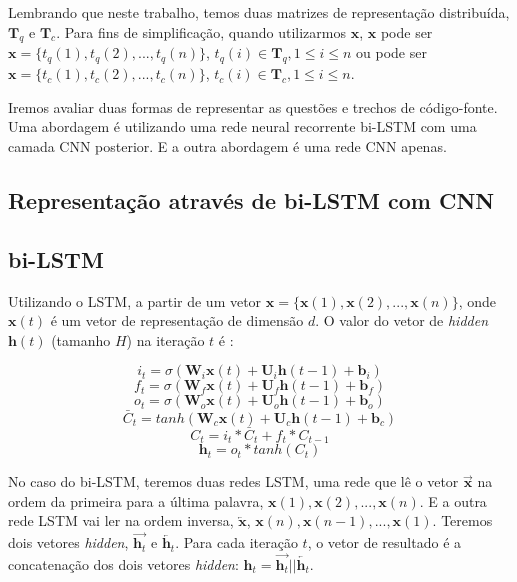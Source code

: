 Lembrando que neste trabalho, temos duas matrizes de representação distribuída, $\bm{T}_{q}$ e $\bm{T}_{c}$. Para fins de simplificação, quando utilizarmos $\bm{x}$, $\bm{x}$ pode ser $\bm{x} = \{ t_{q}(1), t_{q}(2), . . ., t_{q}(n)\}$, $t_{q}(i) \in \bm{T}_{q}, 1 \leq i \leq n$ ou pode ser $\bm{x} = \{ t_{c}(1), t_{c}(2), . . ., t_{c}(n)\}$, $t_{c}(i) \in \bm{T}_{c}, 1 \leq i \leq n$.


Iremos avaliar duas formas de representar as questões e trechos de código-fonte. Uma abordagem é utilizando uma rede neural recorrente bi-LSTM com uma camada CNN posterior. E a outra abordagem é uma rede CNN apenas.

\subsection{Representação através de bi-LSTM com CNN}
\label{sec:representation-bi-lstm-cnn}
\subsection{bi-LSTM}
\label{sec:representation-bi-lstm}
Utilizando o LSTM, a partir de um vetor $\bm{x} = \{ \bm{x}(1), \bm{x}(2), . . ., \bm{x}(n) \}$, onde $\bm{x}(t)$ é um vetor de representação de dimensão $d$. O valor do vetor de \textit{hidden} $\bm{h}(t)$ (tamanho $H$) na iteração $t$ é \citep{tan-lstm-qa}:

\begin{equation}
    i_{t} = \sigma(\bm{W}_{i}\bm{x}(t) + \bm{U}_{i}\bm{h}(t - 1) + \bm{b}_{i})
\end{equation}
\begin{equation}
    f_{t} = \sigma(\bm{W}_{f}\bm{x}(t) + \bm{U}_{f}\bm{h}(t - 1) + \bm{b}_{f})
\end{equation}
\begin{equation}
    o_{t} = \sigma(\bm{W}_{o}\bm{x}(t) + \bm{U}_{o}\bm{h}(t - 1) + \bm{b}_{o})
\end{equation}
\begin{equation}
    \bar{C}_{t} = tanh(\bm{W}_{c}\bm{x}(t) + \bm{U}_{c}\bm{h}(t - 1) + \bm{b}_{c})
\end{equation}
\begin{equation}
    C_{t} = i_{t} * \bar{C}_t + f_{t} * C_{t - 1}
\end{equation}
\begin{equation}
    \bm{h}_{t} = o_{t} * tanh(C_{t})
\end{equation}

No caso do bi-LSTM, teremos duas redes LSTM, uma rede que lê o vetor $\overrightarrow{\bm{x}}$ na ordem da primeira para a última palavra, $\bm{x}(1), \bm{x}(2), . . ., \bm{x}(n)$. E a outra rede LSTM vai ler na ordem inversa, $\overleftarrow{\bm{x}}$, $\bm{x}(n), \bm{x}(n - 1), . . ., \bm{x}(1)$. Teremos dois vetores \textit{hidden}, $\overrightarrow{\bm{h}_{t}}$ e $\overleftarrow{\bm{h}_{t}}$. Para cada iteração $t$, o vetor de resultado é a concatenação dos dois vetores \textit{hidden}: $\bm{h}_{t} = \overrightarrow{\bm{h}_{t}} || \overleftarrow{\bm{h}_{t}}$.

